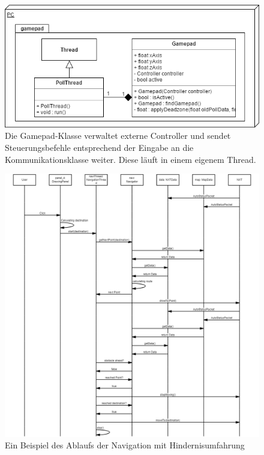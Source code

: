 \documentclass[oneside,abstractoff,a4paper]{scrartcl}
\begin{document}
\begin{figure}
	\includegraphics[width=\textwidth]{Gamepad.png}
    \caption{Die Gamepad-Klasse verwaltet externe Controller und sendet Steuerungsbefehle entsprechend der Eingabe an die Kommunikationsklasse weiter. Diese läuft in einem eigenem Thread.}
    \label{fig:Gamepad}
\end{figure}

\begin{figure}
	\includegraphics[width=\textwidth]{NavigationSequenceDiagram.png}
    \caption{Ein Beispiel des Ablaufs der Navigation mit Hindernisumfahrung}
    \label{fig:navSeqDia}
\end{figure}
\end{document}
